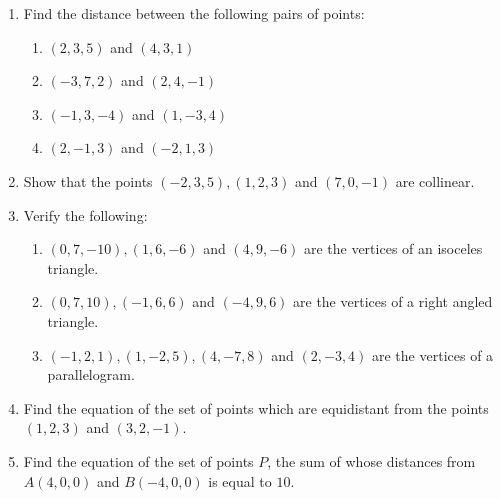 \begin{enumerate}
\item Find the distance between the following pairs of points:
\begin{enumerate}[label=(\roman*)]
\item $(2,3,5)$ and $(4,3,1)$
\item $(-3,7,2)$ and $(2,4,-1)$
\item $(-1,3,-4)$ and $(1,-3,4)$
\item $(2,-1,3)$ and $(-2,1,3)$
\end{enumerate}
\item Show that the points $(-2,3,5), (1,2,3)$ and $(7,0,-1)$ are collinear.
\item Verify the following:
\begin{enumerate}[label=(\roman*)]
\item $(0,7,-10), (1,6,-6)$ and $(4,9,-6)$ are the vertices of an isoceles triangle.
\item $(0,7,10), (-1,6,6)$ and $(-4,9,6)$ are the vertices of a right angled triangle.
\item $(-1,2,1), (1,-2,5), (4,-7,8)$ and $(2,-3,4)$ are the vertices of a parallelogram.
\end{enumerate}
\item Find the equation of the set of points which are equidistant from the points $(1,2,3)$ and $(3,2,-1)$.
\item Find the equation of the set of points $P$, the sum of whose distances from $A(4,0,0)$ and $B(-4,0,0)$ is equal to $10$.
\end{enumerate}
